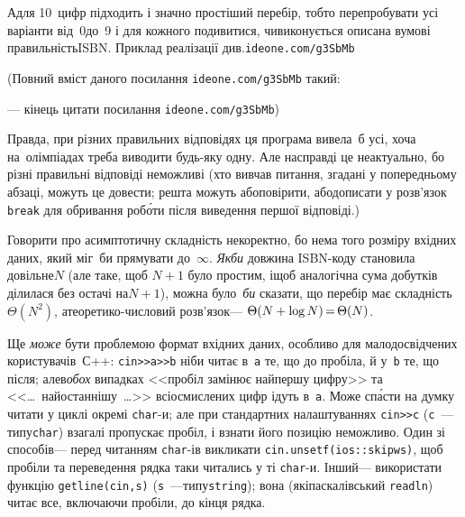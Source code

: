 \documentclass[14pt,a4paper]{extarticle}
\def\dib#1{\,#1\discretionary{}{\mbox{$#1$}}{}\,}
\renewcommand{\baselinestretch}{1.3125}
\begin{document}
А\nolinebreak[3] для 10~цифр підходить і значно простіший перебір, тобто перепробувати усі варіанти від~0\nolinebreak[1] до~9 і для кожного подивитися, чи\nolinebreak[3] виконується описана в\nolinebreak[3] умові правильність\nolinebreak[3] ISBN. Приклад реалізації див.\nolinebreak[1] 
\verb"ideone.com/g3SbMb"


{\color{green}\begin{small}

\renewcommand{\baselinestretch}{0.875}

(Повний вміст даного посилання \verb"ideone.com/g3SbMb" такий:

--- кінець цитати посилання \verb"ideone.com/g3SbMb")

\end{small}}


\hspace{0.5em plus 1em} Правда, при різних правильних відповідях ця програма вивела~б усі, хоча на~олімпіадах треба виводити будь-яку одну. Але насправді це неактуально, бо різні правильні відповіді неможливі (хто вивчав питання, згадані у попередньому абзаці, можуть це довести; решта можуть або\nolinebreak[3] повірити, або\nolinebreak[3] дописати у розв'язок \verb"break" для обривання роб\'{о}ти після виведення першої відповіді.)

Говорити про асимптотичну складність некоректно, бо нема того розміру вхідних даних, який міг~би прямувати до~$\infty$. \emph{Якби} довжина ISBN-коду становила довільне\nolinebreak[3] $N$ (але таке, щоб $N{+}1$ було простим, і\nolinebreak[3] щоб аналогічна сума добутків ділилася без остачі на\nolinebreak[2] $N{+}1$), можна було~\emph{би} сказати, що перебір має складність\nolinebreak[3] $\Theta(N^2)$, а\nolinebreak[3] теоретико-числовий розв'язок\nolinebreak[3] --- ${\Theta(N+\log{}N)}\dib{{=}}{\Theta(N)}$.

Ще \emph{може} бути проблемою формат вхідних даних, особливо для малодосвідчених користувачів~\mbox{С++}: \verb"cin>>a>>b" ніби читає в~\verb"a" те, що до пробіла, й у~\verb"b" те, що після; але\nolinebreak[3] в\nolinebreak[2] \emph{обох} випадках <<пробіл замінює найпершу цифру>> та <<\dots~найостаннішу~\dots>> всі\nolinebreak[1] осмислених цифр ідуть в~\verb"a". Може сп\'{а}сти на думку читати у циклі окремі \mbox{\verb"char"-и}; але при стандартних налаштуваннях \verb"cin>>c" (\verb"c"~---\nolinebreak[1] типу\nolinebreak[2] \verb"char") взагалі пропускає пробіл, і взнати його позицію неможливо. Один зі способів\nolinebreak[3] --- перед читанням \mbox{\verb"char"-ів} викликати %
\verb"cin.unsetf(ios::skipws)", щоб пробіли та переведення рядка таки читались у ті \mbox{\verb"char"-и}. Інший\nolinebreak[3] --- використати функцію \verb"getline(cin,s)" (\verb"s"~---\nolinebreak[1] типу\nolinebreak[1] \verb"string"); вона (як\nolinebreak[2] і\nolinebreak[2] паскалівський \verb"readln") читає все, включаючи пробіли, до кінця рядка.
\end{document}
